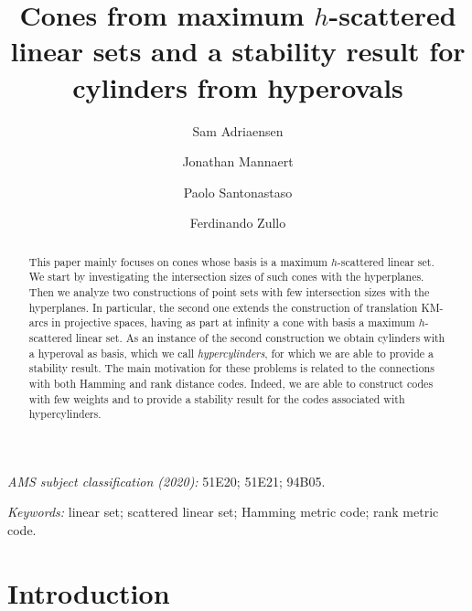 \documentclass[11pt]{amsart}
\title[Cones from maximum $h$-scattered linear sets and a stability result]{Cones from maximum $h$-scattered linear sets and a stability result for cylinders from hyperovals}
\author[S. Adriaensen]{Sam Adriaensen}
\author[J. Mannaert]{Jonathan Mannaert}
\author[P. Santonastaso]{Paolo Santonastaso}
\author[F. Zullo]{Ferdinando Zullo}
\date{}
\begin{document}
\maketitle

\begin{abstract}
    This paper mainly focuses on cones whose basis is a maximum $h$-scattered linear set. We start by investigating the intersection sizes of such cones with the hyperplanes. Then we analyze two constructions of point sets with few intersection sizes with the hyperplanes. In particular, the second one extends the construction of translation KM-arcs in projective spaces, having as part at infinity a cone with basis a maximum $h$-scattered linear set. As an instance of the second construction we obtain cylinders with a hyperoval as basis, which we call \emph{hypercylinders}, for which we are able to provide a stability result. The main motivation for these problems is related to the connections with both Hamming and rank distance codes. Indeed, we are able to construct codes with few weights and to provide a stability result for the codes associated with hypercylinders.
\end{abstract}

\bigskip
{\it AMS subject classification (2020):} 51E20; 51E21; 94B05.

\bigskip
{\it Keywords:} linear set;  scattered linear set; Hamming metric code; rank metric code.

\section{Introduction}
\end{document}
